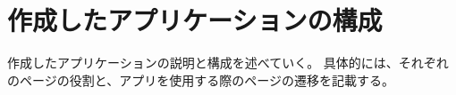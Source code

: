 \documentclass[main]{subfiles}
\begin{document}
\chapter{作成したアプリケーションの構成}
作成したアプリケーションの説明と構成を述べていく。
具体的には、それぞれのページの役割と、アプリを使用する際のページの遷移を記載する。
\end{document}
